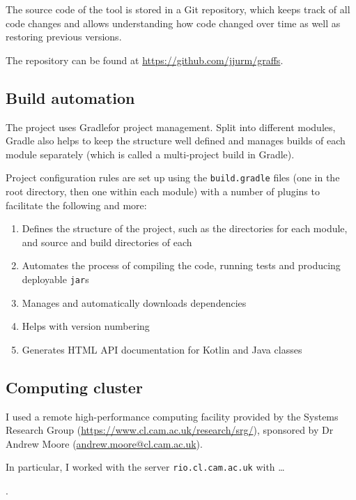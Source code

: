The source code of the \graffs tool is stored in a Git repository, which keeps track of all code changes and allows understanding how code changed over time as well as restoring previous versions.

The repository can be found at \url{https://github.com/jjurm/graffs}.

\subsection{Build automation}

The project uses Gradle\citeneeded for project management.
Split into different modules, Gradle also helps to keep the structure well defined and manages builds of each module separately (which is called a multi-project build in Gradle).

Project configuration rules are set up using the \texttt{build.gradle} files (one in the root directory, then one within each module) with a number of plugins to facilitate the following and more:
\begin{enumerate}
    \item Defines the structure of the project, such as the directories for each module, and source and build directories of each
    \item Automates the process of compiling the code, running tests and producing deployable \texttt{jar}s
    \item Manages and automatically downloads dependencies
    \item Helps with version numbering
    \item Generates HTML API documentation for Kotlin and Java classes
\end{enumerate}



\subsection{Computing cluster}\label{sec:computing_cluster}

I used a remote high-performance computing facility provided by the Systems Research Group (\url{https://www.cl.cam.ac.uk/research/srg/}), sponsored by Dr Andrew Moore (\url{andrew.moore@cl.cam.ac.uk}).

In particular, I worked with the server \texttt{rio.cl.cam.ac.uk} with \ldots

.

